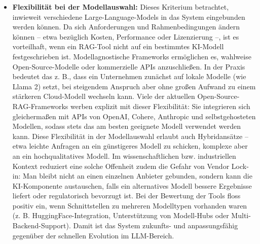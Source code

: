 \begin{itemize}
    \item \textbf{Flexibilität bei der Modellauswahl:} Dieses Kriterium betrachtet, inwieweit verschiedene Large-Language-Models in das System eingebunden werden können. Da sich Anforderungen und Rahmenbedingungen ändern können – etwa bezüglich Kosten, Performance oder Lizenzierung –, ist es vorteilhaft, wenn ein RAG-Tool nicht auf ein bestimmtes KI-Modell festgeschrieben ist. Modellagnostische Frameworks ermöglichen es, wahlweise Open-Source-Modelle oder kommerzielle APIs anzuschließen. In der Praxis bedeutet das z. B., dass ein Unternehmen zunächst auf lokale Modelle (wie Llama 2) setzt, bei steigendem Anspruch aber ohne großen Aufwand zu einem stärkeren Cloud-Modell wechseln kann. Viele der aktuellen Open-Source-RAG-Frameworks werben explizit mit dieser Flexibilität: Sie integrieren sich gleichermaßen mit APIs von OpenAI, Cohere, Anthropic und selbstgehosteten Modellen, sodass stets das am besten geeignete Modell verwendet werden kann. Diese Flexibilität in der Modellauswahl erlaubt auch Hybridansätze – etwa leichte Anfragen an ein günstigeres Modell zu schicken, komplexe aber an ein hochqualitatives Modell. Im wissenschaftlichen bzw. industriellen Kontext reduziert eine solche Offenheit zudem die Gefahr von Vendor Lock-in: Man bleibt nicht an einen einzelnen Anbieter gebunden, sondern kann die KI-Komponente austauschen, falls ein alternatives Modell bessere Ergebnisse liefert oder regulatorisch bevorzugt ist. Bei der Bewertung der Tools floss positiv ein, wenn Schnittstellen zu mehreren Modelltypen vorhanden waren (z. B. HuggingFace-Integration, Unterstützung von Modell-Hubs oder Multi-Backend-Support). Damit ist das System zukunfts- und anpassungsfähig gegenüber der schnellen Evolution im LLM-Bereich.

\end{itemize}
